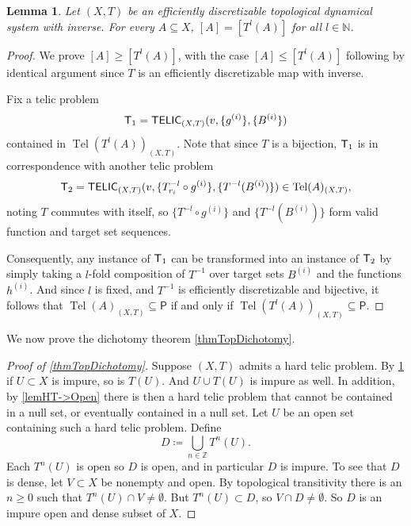 \documentclass{amsart}
\theoremstyle{theorem}
\newtheorem{lemma}[theorem]{Lemma}
\theoremstyle{remark}
\numberwithin{equation}{section}
\DeclareMathOperator{\Tel}{Tel}
\newcommand{\NN}{\mathbb{N}}
\newcommand{\ZZ}{\mathbb{Z}}
\newcommand{\ccT}{\textsf{\upshape T}}
\newcommand{\ccTELIC}{\textsf{\upshape TELIC}}
\begin{document}
\begin{lemma}\label{lemUnion}
Let $(X, T)$ be an efficiently discretizable topological dynamical system with inverse. For every $A \subseteq X$, $[A] = [T^l(A)]$ for all $l \in \NN$.
\end{lemma}
\begin{proof}
We prove $[A] \geq [T^l(A)]$, with the case $[A] \leq [T^l(A)]$ following by identical argument since $T$ is an efficiently discretizable map with inverse.

Fix a telic problem 
\[
\ccT_1=\ccTELIC_{(X, T)}(v,\{g^{(i)}\},\{B^{(i)}\})
\]
contained in $\Tel(T^l(A))_{(X, T)}$.
Note that since $T$ is a bijection, $\ccT_1$ is in correspondence with another telic problem 
\[
\ccT_2 = \ccTELIC_{(X, T)}(v,\{T_{r_i}^{-l} \circ g^{(i)}\},\{T^{-l}(B^{(i)})\}) \in \Tel(A)_{(X, T)},
\]
noting $T$ commutes with itself, so $\{T^{-l}\circ g^{(i)}\}$ and $\{T^{-l}(B^{(i)})\}$ form valid function and target set sequences.

Consequently, any instance of $\ccT_1$ can be transformed into an instance of $\ccT_2$ by simply taking a $l$-fold composition of $T^{-1}$ over target sets $B^{(i)}$ and the functions $h^{(i)}$. And since $l$ is fixed, and $T^{-1}$ is efficiently discretizable and bijective, it follows that $\Tel(A)_{(X, T)} \subseteq \textsf{P}$ if and only if $\Tel(T^l(A))_{(X, T)} \subseteq \textsf{P}$.
\end{proof}

We now prove the dichotomy theorem \cref{thmTopDichotomy}.

\begin{proof}[Proof of \cref{thmTopDichotomy}]
Suppose $(X, T)$ admits a hard telic problem. By \cref{lemUnion} if $U \subset X$ is impure, so is $T(U)$. And $U \cup T(U)$ is impure as well.
In addition, by \cref{lemHT->Open} there is then a hard telic problem that cannot be contained in a null set, or eventually contained in a null set. Let $U$ be an open set containing such a hard telic problem. Define
\[
D \coloneqq \bigcup_{n \in \ZZ} T^n(U).
\]
Each $T^n(U)$ is open so $D$ is open, and in particular $D$ is impure. To see that $D$ is dense, let $V \subset X$ be nonempty and open. By topological transitivity there is an $n\geq 0$ such that $T^n(U) \cap V \neq \emptyset$. But $T^n(U) \subset D$, so $V \cap D \neq \emptyset$. So $D$ is an impure open and dense subset of $X$.
\end{proof}




\end{document}
